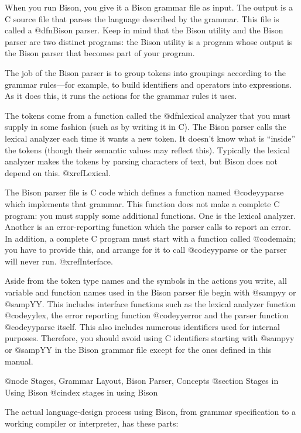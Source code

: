 When you run Bison, you give it a Bison grammar file as input.  The output
is a C source file that parses the language described by the grammar.
This file is called a @dfn{Bison parser}.  Keep in mind that the Bison
utility and the Bison parser are two distinct programs: the Bison utility
is a program whose output is the Bison parser that becomes part of your
program.

The job of the Bison parser is to group tokens into groupings according to
the grammar rules---for example, to build identifiers and operators into
expressions.  As it does this, it runs the actions for the grammar rules it
uses.

The tokens come from a function called the @dfn{lexical analyzer} that you
must supply in some fashion (such as by writing it in C).  The Bison parser
calls the lexical analyzer each time it wants a new token.  It doesn't know
what is ``inside'' the tokens (though their semantic values may reflect
this).  Typically the lexical analyzer makes the tokens by parsing
characters of text, but Bison does not depend on this.  @xref{Lexical}.

The Bison parser file is C code which defines a function named
@code{yyparse} which implements that grammar.  This function does not make
a complete C program: you must supply some additional functions.  One is
the lexical analyzer.  Another is an error-reporting function which the
parser calls to report an error.  In addition, a complete C program must
start with a function called @code{main}; you have to provide this, and
arrange for it to call @code{yyparse} or the parser will never run.
@xref{Interface}.

Aside from the token type names and the symbols in the actions you
write, all variable and function names used in the Bison parser file
begin with @samp{yy} or @samp{YY}.  This includes interface functions
such as the lexical analyzer function @code{yylex}, the error reporting
function @code{yyerror} and the parser function @code{yyparse} itself.
This also includes numerous identifiers used for internal purposes.
Therefore, you should avoid using C identifiers starting with @samp{yy}
or @samp{YY} in the Bison grammar file except for the ones defined in
this manual.

@node Stages, Grammar Layout, Bison Parser, Concepts
@section Stages in Using Bison
@cindex stages in using Bison

The actual language-design process using Bison, from grammar specification
to a working compiler or interpreter, has these parts:

